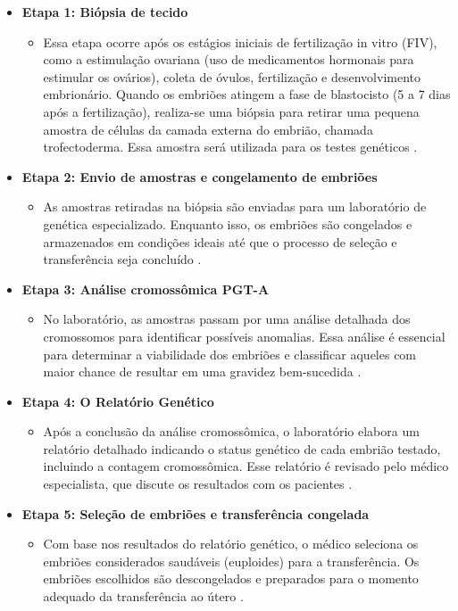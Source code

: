 \begin{itemize}
    \item \textbf{Etapa 1: Biópsia de tecido}
    \begin{itemize}
        \item Essa etapa ocorre após os estágios iniciais de fertilização in vitro (FIV), como a estimulação ovariana (uso de medicamentos hormonais para estimular os ovários), coleta de óvulos, fertilização e desenvolvimento embrionário. Quando os embriões atingem a fase de blastocisto (5 a 7 dias após a fertilização), realiza-se uma biópsia para retirar uma pequena amostra de células da camada externa do embrião, chamada trofectoderma. Essa amostra será utilizada para os testes genéticos \cite{cnyfertility2024}.
    \end{itemize}

    \item \textbf{Etapa 2: Envio de amostras e congelamento de embriões}
    \begin{itemize}
        \item As amostras retiradas na biópsia são enviadas para um laboratório de genética especializado. Enquanto isso, os embriões são congelados e armazenados em condições ideais até que o processo de seleção e transferência seja concluído \cite{cnyfertility2024}.
    \end{itemize}

    \item \textbf{Etapa 3: Análise cromossômica PGT-A}
    \begin{itemize}
        \item No laboratório, as amostras passam por uma análise detalhada dos cromossomos para identificar possíveis anomalias. Essa análise é essencial para determinar a viabilidade dos embriões e classificar aqueles com maior chance de resultar em uma gravidez bem-sucedida \cite{cnyfertility2024}.
    \end{itemize}

    \item \textbf{Etapa 4: O Relatório Genético}
    \begin{itemize}
        \item Após a conclusão da análise cromossômica, o laboratório elabora um relatório detalhado indicando o status genético de cada embrião testado, incluindo a contagem cromossômica. Esse relatório é revisado pelo médico especialista, que discute os resultados com os pacientes \cite{cnyfertility2024}.
    \end{itemize}

    \item \textbf{Etapa 5: Seleção de embriões e transferência congelada}
    \begin{itemize}
        \item Com base nos resultados do relatório genético, o médico seleciona os embriões considerados saudáveis (euploides) para a transferência. Os embriões escolhidos são descongelados e preparados para o momento adequado da transferência ao útero \cite{cnyfertility2024}.
    \end{itemize}
\end{itemize}

